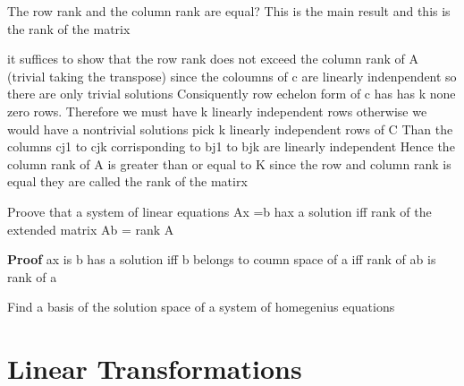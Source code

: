 \documentclass[twocolumn]{article}
\begin{document}
The row rank and the column rank are equal? This is the main result and
this is the rank of the matrix

it suffices to show that the row rank does not exceed the column rank of
A (trivial taking the transpose) since the coloumns of c are linearly
indenpendent so there are only trivial solutions Consiquently row
echelon form of c has has k none zero rows. Therefore we must have k
linearly independent rows otherwise we would have a nontrivial solutions
pick k linearly independent rows of C Than the columns cj1 to cjk
corrisponding to bj1 to bjk are linearly independent Hence the column
rank of A is greater than or equal to K since the row and column rank is
equal they are called the rank of the matirx

Proove that a system of linear equations Ax =b hax a solution iff rank
of the extended matrix A\textbar{}b = rank A

\textbf{Proof} ax is b has a solution iff b belongs to coumn space of a
iff rank of ab is rank of a

Find a basis of the solution space of a system of homegenius equations

\hypertarget{linear-transformations}{%
\section{Linear Transformations}\label{linear-transformations}}
\end{document}
